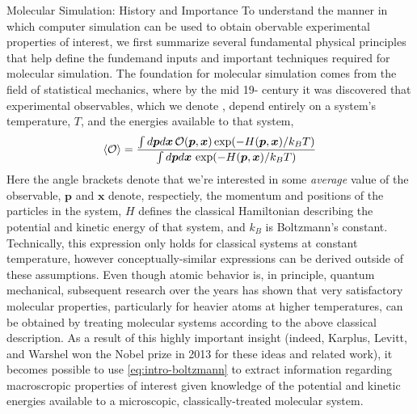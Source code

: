 \begin{section}{Molecular Simulation: History and Importance}
To understand the manner in which computer simulation can be used to obtain obervable experimental properties
of interest,\footnotemark{} we first summarize several fundamental
physical principles
that help define the
fundemand inputs and important techniques required for molecular simulation.
The foundation for molecular simulation comes from the field of
statistical mechanics, where by the mid 19- century it was discovered
that experimental observables, which we denote \obs, depend entirely on
a system's temperature, $T$, and the energies available to that system,
%
\begin{align}
\label{eq:intro-boltzmann}
\braket{\mathcal{O}} = 
\frac{\int d\bm p d\bm x \, \mathcal{O}(\bm p, \bm x) \exp (-H(\bm p, \bm x)/k_BT)}
{\int  d\bm p d\bm x \, \exp (-H(\bm p, \bm x)/k_BT) }
\end{align}
%
Here the angle brackets denote that we're interested in some \emph{average}
value of the observable, $\bm p$ and $\bm x$ denote, respectiely, the momentum
and positions of the particles in the system, 
$H$ defines the classical Hamiltonian describing the potential and kinetic
energy of that system,
and $k_B$ is Boltzmann's constant.\cite{allen1989computer}
Technically,
this expression only holds for classical systems at constant temperature,
however conceptually-similar expressions can be derived outside of these
assumptions. 
Even though atomic behavior is, in principle, quantum mechanical,
subsequent research over the years has shown that
very satisfactory molecular properties, particularly for heavier atoms at higher
temperatures,
\cite{Karplus2014}
can be obtained by treating molecular systems according to the above classical
description.
As a result of this highly important insight (indeed, Karplus, Levitt, and
Warshel won the Nobel prize in 2013 for these ideas and related
work),\cite{Karplus2014} it becomes possible to use
\cref{eq:intro-boltzmann} to
extract information regarding macroscropic properties of
interest 
given knowledge of the potential and kinetic energies
available to a microscopic, classically-treated molecular system.



\end{section}
